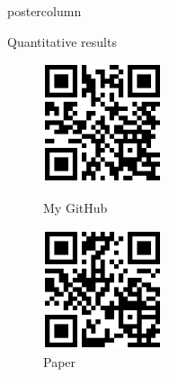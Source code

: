 \documentclass[final,hyperref={pdfpagelabels=false}]{beamer}
\newlength{\columnheight}
\begin{document}
\begin{frame}[t]
{\begin{minipage}[t][\columnheight][c]{0.95\textwidth}
{\begin{columns}[T,totalwidth=\textwidth]
\begin{column}{.34\textwidth}
\begin{beamercolorbox}[center,wd=\textwidth]{postercolumn}
\begin{minipage}[T]{\textwidth}
{            %
            \vfill            
            \begin{block}{Quantitative results}
            \noindent\makebox[\textwidth][c]{%
            \begin{minipage}[T][][c]{.75\textwidth} 
            
            
            \end{minipage}
            }
            \end{block}
            \vfill
            \begin{exampleblock}{}
            \begin{figure}
                \centering
                \begin{minipage}{0.45\textwidth}
                \centering
                \includegraphics[height=3.5cm]{logos/qrcode-github}
                \caption{\tiny My GitHub}
                \end{minipage}\hfill
                \begin{minipage}{0.45\textwidth}
                \centering
                \includegraphics[height=3.5cm]{logos/qrcode-paper}
                \caption{\tiny Paper}
                \end{minipage}
                \end{figure}
            \end{exampleblock}
          }
        \end{minipage}
      \end{beamercolorbox}
    \end{column}


\end{columns}}
\end{minipage}}
\end{frame}
\end{document}
